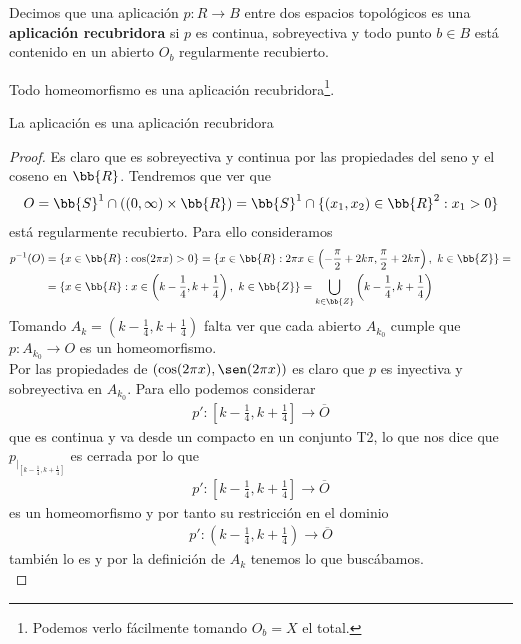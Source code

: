 \begin{definicion}
    Decimos que una aplicación $p:R \to B$ entre dos espacios topológicos es una \textbf{aplicación recubridora} si $p$ es continua, sobreyectiva y todo punto $b \in B$ está contenido en un abierto $O_b$ regularmente recubierto.
\end{definicion}

\begin{observacion}
    Todo homeomorfismo es una aplicación recubridora\footnote{Podemos verlo fácilmente tomando $O_b = X$ el total.}. 
\end{observacion}

\begin{teo}
    La aplicación
    es una aplicación recubridora
    \begin{proof}
        Es claro que es sobreyectiva y continua por las propiedades del seno y el coseno en $\bb{R}$. Tendremos que ver que 
        \begin{gather*}
            O=\bb{S}^1\cap ((0,\infty)\times \bb{R}) = \bb{S}^1 \cap \{(x_1,x_2)\in \bb{R}^2 : x_1>0\}
        \end{gather*}
        está regularmente recubierto. Para ello consideramos
        \begin{align*}
            p^{-1}(O) &= \{x\in \bb{R}: \cos(2\pi x) > 0\} = \{x\in \bb{R} : 2\pi x \in \left(-\frac{\pi}{2} + 2k\pi, \frac{\pi}{2} +2k\pi\right),\ k\in \bb{Z}\} =\\
            &=\{x\in \bb{R} : x \in \left(k-\frac{1}{4}, k+\frac{1}{4}\right),\ k\in \bb{Z}\} = \bigcup\limits_{k\in \bb{Z}}\left(k-\frac{1}{4}, k+\frac{1}{4}\right)
        \end{align*}
        Tomando $A_k = \left(k-\frac{1}{4}, k+\frac{1}{4}\right)$ falta ver que cada abierto $A_{k_0}$ cumple que $p:A_{k_0} \to O$ es un homeomorfismo.\\

        Por las propiedades de $(\cos(2\pi x), \sen(2\pi x))$ es claro que $p$ es inyectiva y sobreyectiva en $A_{k_0}$. Para ello podemos considerar 
        \begin{align*}
            p':\left[k-\frac{1}{4}, k+\frac{1}{4}\right] \to \overline{O}
        \end{align*}
        que es continua y va desde un compacto en un conjunto T2, lo que nos dice que $p_{|_{\left[k-\frac{1}{4}, k+\frac{1}{4}\right]}}$ es cerrada por lo que
        \begin{gather*}
            p':\left[k-\frac{1}{4}, k+\frac{1}{4}\right] \to \overline{O}
        \end{gather*}
        es un homeomorfismo y por tanto su restricción en el dominio
        \begin{gather*}
            p':\left(k-\frac{1}{4}, k+\frac{1}{4}\right) \to \overline{O}
        \end{gather*}
        también lo es y por la definición de $A_k$ tenemos lo que buscábamos. \\


\end{proof}
\end{teo}
